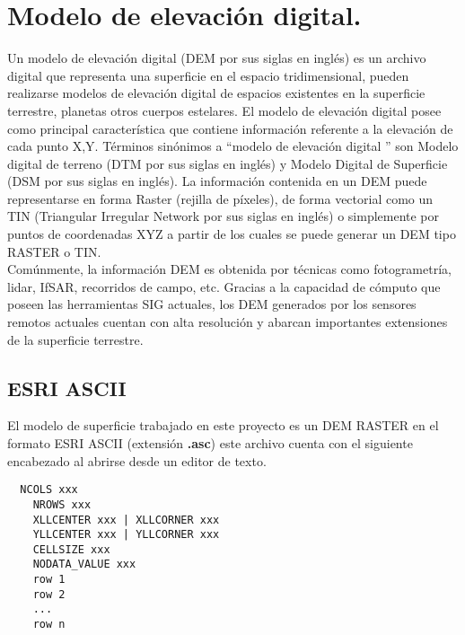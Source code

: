 \section{Modelo de elevaci\'{o}n digital.}


Un modelo de elevaci\'{o}n digital (DEM por sus siglas en ingl\'{e}s) es un archivo digital que
representa una superficie en el espacio tridimensional, pueden realizarse modelos de
elevaci\'{o}n digital de espacios existentes en la superficie terrestre, planetas otros cuerpos
estelares.
El modelo de elevaci\'{o}n digital posee como principal caracter\'{i}stica que contiene informaci\'{o}n
referente a la elevaci\'{o}n de cada punto X,Y.
T\'{e}rminos sin\'{o}nimos a  ``modelo de elevaci\'{o}n digital '' son Modelo digital de terreno (DTM por
sus siglas en ingl\'{e}s) y Modelo Digital de Superficie (DSM por sus siglas en ingl\'{e}s).
La informaci\'{o}n contenida en un DEM puede representarse en forma Raster (rejilla de
p\'ixeles), de forma vectorial como un TIN (Triangular Irregular Network por sus siglas en
ingl\'{e}s) o simplemente por puntos de coordenadas XYZ a partir de los cuales se puede
generar un DEM tipo RASTER o TIN.\\
Com\'{u}nmente, la informaci\'{o}n DEM es obtenida por t\'ecnicas como fotogrametr\'{i}a, lidar,
IfSAR, recorridos de campo, etc. Gracias a la capacidad de c\'{o}mputo que poseen las
herramientas SIG actuales, los DEM generados por los sensores remotos actuales cuentan
con alta resoluci\'{o}n y abarcan importantes extensiones de la superficie terrestre.
\\
\subsection{ESRI ASCII}

El modelo de superficie trabajado en este proyecto es un DEM RASTER en el formato ESRI
ASCII (extensi\'{o}n \textbf{.asc}) este archivo cuenta con el siguiente encabezado al abrirse desde un
editor de texto.

\begin{lstlisting}
  NCOLS xxx
    NROWS xxx
    XLLCENTER xxx | XLLCORNER xxx
    YLLCENTER xxx | YLLCORNER xxx
    CELLSIZE xxx
    NODATA_VALUE xxx
    row 1
    row 2
    ...
    row n
\end{lstlisting}

